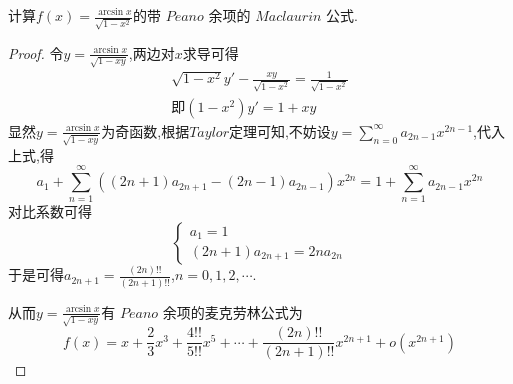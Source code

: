 \documentclass[lang=cn,newtx,10pt,scheme=chinese]{../Template/elegantbook}
\begin{document}
\begin{exercise}
    计算$f(x)=\frac{\arcsin x}{\sqrt{1-x^2}}$的带 $Peano$ 余项的 $Maclaurin$ 公式.
    \begin{proof}
    令\(y=\frac{\arcsin x}{\sqrt{1 - xy}}\),两边对\(x\)求导可得
    \begin{gather}
    \sqrt{1 - x^{2}}y'-\frac{xy}{\sqrt{1 - x^{2}}}=\frac{1}{\sqrt{1-x^2}}
    \nonumber\\
    \text{即}(1 - x^{2})y' = 1 + xy
    \nonumber
    \end{gather}
    显然$y=\frac{\arcsin x}{\sqrt{1 - xy}}$为奇函数,根据$Taylor$定理可知,不妨设\(y=\sum_{n = 0}^{\infty}a_{2n-1}x^{2n-1}\),代入上式,得
    \begin{equation}
    a_{1}+\sum_{n = 1}^{\infty}\left((2n + 1)a_{2n + 1}-(2n - 1)a_{2n - 1}\right)x^{2n}=1+\sum_{n = 1}^{\infty}a_{2n - 1}x^{2n}
    \nonumber
    \end{equation}
    对比系数可得
    \begin{equation}
    \begin{cases}a_{1}=1\\(2n + 1)a_{2n + 1}=2na_{2n}\end{cases}
    \nonumber
    \end{equation}
    于是可得\(a_{2n + 1}=\frac{(2n)!!}{(2n + 1)!!}\),\(n = 0,1,2,\cdots\).
    
    从而\(y=\frac{\arcsin x}{\sqrt{1 - xy}}\)有 $Peano$ 余项的麦克劳林公式为
    \begin{equation}
         f(x)=x+\frac{2}{3}x^{3}+\frac{4!!}{5!!}x^{5}+\cdots+\frac{(2n)!!}{(2n + 1)!!}x^{2n + 1}+o(x^{2n + 1})
        \nonumber
    \end{equation}    
    
\end{proof}
\end{exercise}
\end{document}
